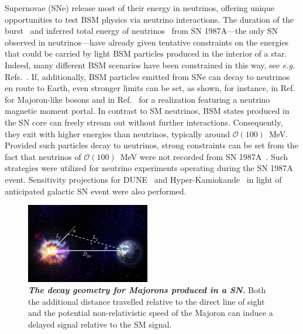\documentclass[aps,twocolumn,prl,showpacs,showkeys,preprintnumbers,superscriptaddress,nobibnotes,floatfix,longbibliography,notitlepage,nofootinbib]{revtex4-2}
\begin{document}
Supernovae (SNe) release most of their energy in neutrinos, offering unique opportunities to test BSM physics via neutrino interactions.
The duration of the burst~\cite{Kamiokande-II:1987idp,Bionta:1987qt,Baksan} and inferred total energy of neutrinos~\cite{Loredo:2001rx,Pagliaroli:2008ur,Huedepohl2010} from SN 1987A---the only SN observed in neutrinos---have already given tentative constraints on the energies that could be carried by light BSM particles produced in the interior of a star.
Indeed, many different BSM scenarios have been constrained in this way, see \textit{e.g.} Refs.~\cite{Raffelt:2011nc,Arguelles:2016uwb,Suliga:2020vpz,Lucente:2021hbp,Caputo:2022rca,Caputo:2021rux,PhysRevD.100.083002,DeRocco:2019njg,Kazanas:2014mca,Magill:2018jla}.
If, additionally, BSM particles emitted from SNe can decay to neutrinos en route to Earth, even stronger limits can be set, as shown, for instance, in Ref.~\cite{Fiorillo:2022cdq} for Majoron-like bosons and in Ref.~\cite{Brdar:2023tmi} for a realization featuring a neutrino magnetic moment portal.
In contrast to SM neutrinos, BSM states produced in the SN core can freely stream out without further interactions.
Consequently, they exit with higher energies than neutrinos, typically around $\mathcal{O}(100)$~MeV.
Provided such particles decay to neutrinos, strong constraints can be set from the fact that neutrinos of $\mathcal{O}(100)$~MeV were not recorded from SN 1987A~\cite{Fiorillo:2022cdq, Brdar:2023tmi}.
Such strategies were utilized for neutrino experiments operating during the SN 1987A event. Sensitivity projections for  DUNE~\cite{DUNE:2015lol} and Hyper-Kamiokande~\cite{Hyper-Kamiokande:2018ofw} in light of anticipated galactic SN event were also performed. 

\begin{figure}[t!]
\vspace{0.27cm}
    \centering
    \includegraphics[width=0.48\textwidth]{figures/Supernova_Diagram}
    \caption{\textit{\textbf{The decay geometry for Majorons produced in a SN.}}
    Both the additional distance travelled relative to the direct line of sight and the potential non-relativistic speed of the Majoron can induce a delayed signal relative to the SM signal.
    }
    \label{fig:geometry}
\end{figure}
\end{document}
